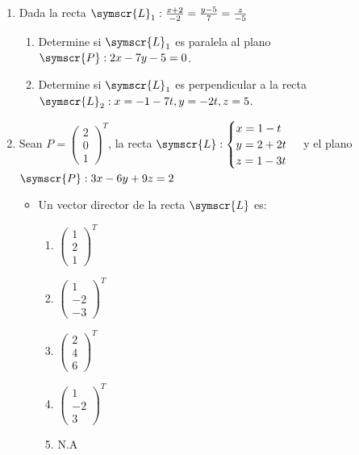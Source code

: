 \documentclass{article}
\def\fancyL{\symscr{L}}
\def\fancyP{\symscr{P}}
\begin{document}
\begin{enumerate}
\begin{enumerate}[label=\listAlph]
    \end{enumerate}
\setcounter{enumi}{17}
\item Dada la recta \(\fancyL_1: \frac{x + 2}{-2} = \frac{y - 5}{7} = \frac{z}{-5}\)
    \begin{enumerate}[label=\listAlph]
        \item Determine si \(\fancyL_1\) es paralela al plano \(\fancyP: 2x - 7y - 5 = 0\).
        \item Determine si \(\fancyL_1\) es perpendicular a la recta \(\fancyL_2: x = -1 -7t, y = -2t, z = 5\).
    \end{enumerate}
\item Sean \(P = \left(\begin{smallmatrix}2 \\ 0 \\ 1\end{smallmatrix}\right)^T\), la recta \(\fancyL: \begin{cases}x = 1 -t \\ y = 2 + 2t \\ z = 1 - 3t\end{cases}\) y el plano \(\fancyP: 3x -6y + 9z = 2\)
        \begin{itemize}
            \item Un vector director de la recta \(\fancyL\) es:
                \begin{enumerate}[label=\listAlph]
                    \item \(\begin{pmatrix}1 \\ 2 \\ 1\end{pmatrix}^T\)
					\item \(\begin{pmatrix}1 \\ -2 \\ -3\end{pmatrix}^T\)
					\item \(\begin{pmatrix}2 \\ 4 \\ 6\end{pmatrix}^T\)
					\item \(\begin{pmatrix}1 \\ -2 \\ 3\end{pmatrix}^T\)
					\item N.A
                \end{enumerate}

\end{itemize}
\end{enumerate}
\end{document}
